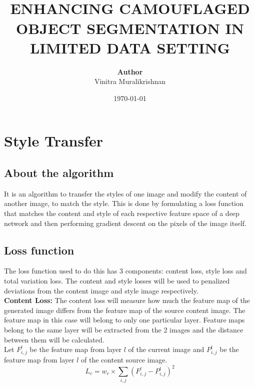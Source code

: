\documentclass{article}
\begin{document}
\title{ \normalsize \textsc{}
		\\ [2.0cm]
		\LARGE \textbf{\uppercase{Enhancing Camouflaged Object Segmentation in Limited Data Setting}
        }
		}
\date{\today}

\author{\textbf{Author} \\ 
		Vinitra Muralikrishnan}

{\let\newpage\relax\maketitle}
\tableofcontents
\newpage

\section{Style Transfer}

\subsection{About the algorithm}
It is an algorithm to transfer the styles of one image and modify the content of another image,
to match the style. This is done by formulating a loss function that matches the content and style of each
respective feature space of a deep network and then performing gradient descent on the pixels of the image itself.

\subsection{Loss function}
The loss function used to do this has 3 components: content loss, style loss and total variation loss. The content and style losses
will be used to penalized deviations from the content image and style image respectively.\\

\textbf{Content Loss:} The content loss will measure how much the feature map of the generated image differs from the feature map of the
source content image. The feature map in this case will belong to only one particular layer. Feature maps belong to the same layer will be
extracted from the 2 images and the distance between them will be calculated.\\
Let $F_{i,j}^{l}$ be the feature map from layer $l$ of the current image and $P_{i,j}^{l}$ be the feature map
from layer $l$ of the content source image.\\
$$L_c = w_c \times \sum_{i,j} (F_{i,j}^{l} - P_{i,j}^{l})^{2}$$
\end{document}
